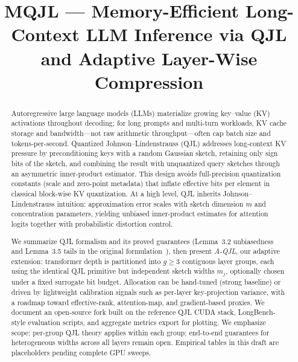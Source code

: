 \documentclass[conference]{IEEEtran}
\begin{document}
\title{MQJL --- Memory-Efficient Long-Context LLM Inference via QJL and Adaptive Layer-Wise Compression}

\author{
\and
{}
}

\maketitle

\begin{abstract}
Autoregressive large language models (LLMs) materialize growing key--value (KV) activations throughout decoding; for long prompts and multi-turn workloads, KV cache storage and bandwidth—not raw arithmetic throughput—often cap batch size and tokens-per-second. Quantized Johnson--Lindenstrauss (QJL) addresses long-context KV pressure by preconditioning keys with a random Gaussian sketch, retaining only sign bits of the sketch, and combining the result with unquantized query sketches through an asymmetric inner-product estimator. This design avoids full-precision quantization constants (scale and zero-point metadata) that inflate effective bits per element in classical block-wise KV quantization. At a high level, QJL inherits Johnson--Lindenstrauss intuition: approximation error scales with sketch dimension \(m\) and concentration parameters, yielding unbiased inner-product estimates for attention logits together with probabilistic distortion control.

We summarize QJL formalism and its proved guarantees (Lemma~3.2 unbiasedness and Lemma~3.5 tails in the original formulation~\cite{zandieh2024qjl}), then present \emph{A-QJL}, our adaptive extension: transformer depth is partitioned into \(g{\geq}3\) contiguous layer groups, each using the identical QJL primitive but independent sketch widths \(m_j\), optionally chosen under a fixed surrogate bit budget. Allocation can be hand-tuned (strong baseline) or driven by lightweight calibration signals such as per-layer key-projection variance, with a roadmap toward effective-rank, attention-map, and gradient-based proxies. We document an open-source fork built on the reference QJL CUDA stack, LongBench-style evaluation scripts, and aggregate metrics export for plotting. We emphasize scope: per-group QJL theory applies within each group; end-to-end guarantees for heterogeneous widths across all layers remain open. Empirical tables in this draft are placeholders pending complete GPU sweeps.
\end{abstract}
\end{document}
